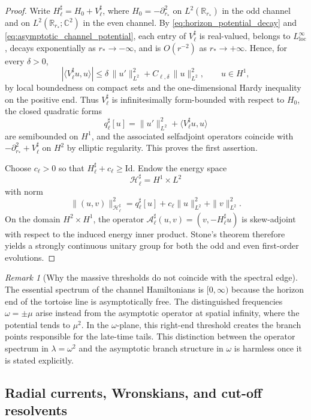 \documentclass[12pt]{article}
\numberwithin{equation}{section}
\theoremstyle{plain}
\theoremstyle{definition}
\theoremstyle{remark}
\newtheorem{remark}{Remark}[section]
\newcommand{\R}{\mathbb R}
\newcommand{\C}{\mathbb C}
\newcommand{\om}{\omega}
\newcommand{\abs}[1]{\left|#1\right|}
\newcommand{\Id}{\mathrm{Id}}
\begin{document}
\begin{proof}
Write $H_{\ell}^{\sharp}=H_0+V_{\ell}^{\sharp}$, where $H_0=-\partial_{r_*}^2$ on $L^2(\R_{r_*})$ in the odd channel and on $L^2(\R_{r_*};\C^2)$ in the even channel.  By \eqref{eq:horizon_potential_decay} and \eqref{eq:asymptotic_channel_potential}, each entry of $V_{\ell}^{\sharp}$ is real-valued, belongs to $L^\infty_{\mathrm{loc}}$, decays exponentially as $r_*\to-\infty$, and is $O(r^{-2})$ as $r_*\to+\infty$.  Hence, for every $\delta>0$,
\[
   \abs{\langle V_{\ell}^{\sharp}u,u\rangle}
   \le \delta\,\|u'\|_{L^2}^2+C_{\ell,\delta}\,\|u\|_{L^2}^2,
   \qquad u\in H^1,
\]
by local boundedness on compact sets and the one-dimensional Hardy inequality on the positive end.  Thus $V_{\ell}^{\sharp}$ is infinitesimally form-bounded with respect to $H_0$, the closed quadratic forms
\[
   q_{\ell}^{\sharp}[u]=\|u'\|_{L^2}^2+\langle V_{\ell}^{\sharp}u,u\rangle
\]
are semibounded on $H^1$, and the associated selfadjoint operators coincide with $-\partial_{r_*}^2+V_{\ell}^{\sharp}$ on $H^2$ by elliptic regularity.  This proves the first assertion.

Choose $c_{\ell}>0$ so that $H_{\ell}^{\sharp}+c_{\ell}\ge \Id$.  Endow the energy space
\[
   \mathcal H_{\ell}^{\sharp}=H^1\times L^2
\]
with norm
\[
   \|(u,v)\|_{\mathcal H_{\ell}^{\sharp}}^2
   =q_{\ell}^{\sharp}[u]+c_{\ell}\|u\|_{L^2}^2+\|v\|_{L^2}^2.
\]
On the domain $H^2\times H^1$, the operator $\mathcal A_{\ell}^{\sharp}(u,v)=(v,-H_{\ell}^{\sharp}u)$ is skew-adjoint with respect to the induced energy inner product.  Stone's theorem therefore yields a strongly continuous unitary group for both the odd and even first-order evolutions.
\end{proof}

\begin{remark}[Why the massive thresholds do not coincide with the spectral edge]
The essential spectrum of the channel Hamiltonians is $[0,\infty)$ because the horizon end of the tortoise line is asymptotically free.  The distinguished frequencies $\om=\pm\mu$ arise instead from the asymptotic operator at spatial infinity, where the potential tends to $\mu^2$.  In the $\om$-plane, this right-end threshold creates the branch points responsible for the late-time tails.  This distinction between the operator spectrum in $\lambda=\om^2$ and the asymptotic branch structure in $\om$ is harmless once it is stated explicitly.
\end{remark}

\subsection{Radial currents, Wronskians, and cut-off resolvents}
\end{document}
